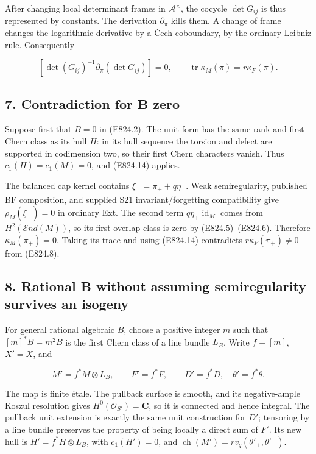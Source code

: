 After changing local determinant frames in \(\mathcal A^\times\), the
cocycle \(\det G_{ij}\) is thus represented by constants. The derivation
\(\partial_\pi\) kills them. A change of frame changes the logarithmic
derivative by a Čech coboundary, by the ordinary Leibniz rule.
Consequently

\[
 [\det(G_{ij})^{-1}\partial_\pi(\det G_{ij})]=0,
 \qquad
 \operatorname{tr}\kappa_M(\pi)=r\kappa_F(\pi).
 \tag{E824.14}
\]

\subsection{7. Contradiction for B zero}\label{SF-E824-contradiction-for-b-zero}

Suppose first that \(B=0\) in (E824.2). The unit form has the same rank
and first Chern class as its hull \(H\): in its hull sequence the
torsion and defect are supported in codimension two, so their first
Chern characters vanish. Thus \(c_1(H)=c_1(M)=0\), and (E824.14)
applies.

The balanced cap kernel contains \(\xi_+=\pi_++q\eta_+\). Weak
semiregularity, published BF composition, and supplied S21
invariant/forgetting compatibility give \(\rho_M(\xi_+)=0\) in ordinary
Ext. The second term \(q\eta_+\operatorname{id}_M\) comes from
\(H^2(\mathcal E nd(M))\), so its first overlap class is zero by
(E824.5)--(E824.6). Therefore \(\kappa_M(\pi_+)=0\). Taking its trace
and using (E824.14) contradicts \(r\kappa_F(\pi_+)\ne0\) from (E824.8).

\subsection{8. Rational B without assuming semiregularity survives an
isogeny}\label{SF-E824-rational-b-without-assuming-semiregularity-survives-an-isogeny}

For general rational algebraic \(B\), choose a positive integer \(m\)
such that \([m]^*B=m^2B\) is the first Chern class of a line bundle
\(L_B\). Write \(f=[m]\), \(X'=X\), and

\[
 M'=f^*M\otimes L_B,
 \qquad F'=f^*F,
 \qquad D'=f^*D,\quad\theta'=f^*\theta.
 \tag{E824.15}
\]

The map is finite étale. The pullback surface is smooth, and its
negative-ample Koszul resolution gives
\(H^0(\mathcal O_{S'})=\mathbf C\), so it is connected and hence
integral. The pullback unit extension is exactly the same unit
construction for \(D'\); tensoring by a line bundle preserves the
property of being locally a direct sum of \(F'\). Its new hull is
\(H'=f^*H\otimes L_B\), with \(c_1(H')=0\), and
\(\operatorname{ch}(M')=r v_q(\theta'_+,\theta'_-)\).

